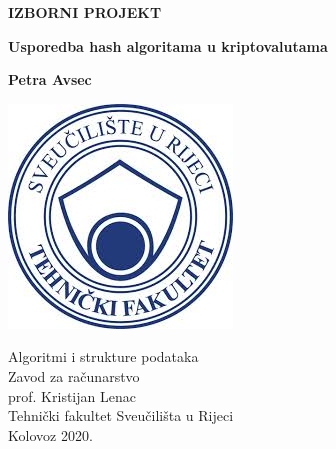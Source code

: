 \documentclass[12pt]{article}
\begin{document}
\begin{titlepage}
	\begin{center}
		\vspace*{1cm}
		
		\LARGE
		\textbf{IZBORNI PROJEKT} 
		
		\vspace{0.5cm}
		\LARGE
		\textbf{Usporedba hash algoritama u kriptovalutama} 
		
		\vspace{1.5cm}
		
		\Large
		\textbf{Petra Avsec}
		
		\vfill
		
		\textsl{}
		\vspace{0.8cm}
		
		\includegraphics[scale=0.5,keepaspectratio]{slike/riteh}
		
		\Large
		Algoritmi i strukture podataka \\
		Zavod za računarstvo\\
		prof. Kristijan Lenac \\
		Tehnički fakultet Sveučilišta u Rijeci \\
		Kolovoz 2020. 
		
		
	\end{center}
\end{titlepage}

\tableofcontents

\pagebreak
\end{document}

